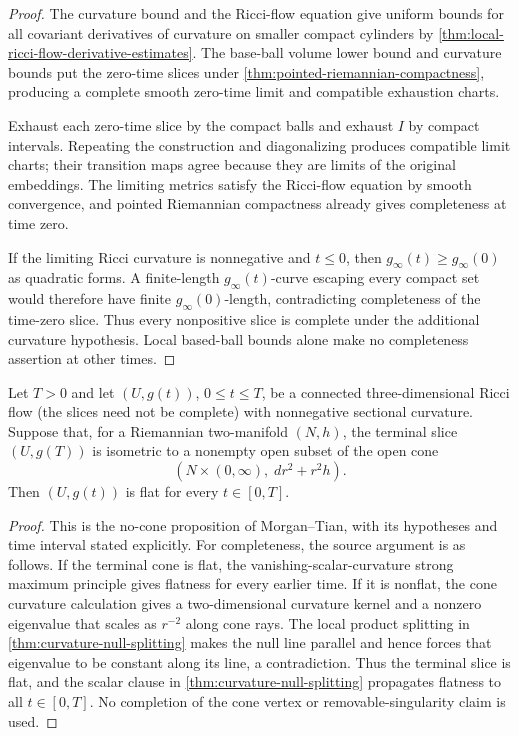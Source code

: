 \begin{proof}
The curvature bound and the Ricci-flow equation give uniform bounds for all
covariant derivatives of curvature on smaller compact cylinders by
\ref{thm:local-ricci-flow-derivative-estimates}.  The base-ball volume lower
bound and curvature bounds put the zero-time slices under
\ref{thm:pointed-riemannian-compactness}, producing a complete smooth
zero-time limit and compatible exhaustion charts.

Exhaust each zero-time slice by the compact balls and exhaust $I$ by compact
intervals.  Repeating the construction and diagonalizing produces compatible
limit charts; their transition maps agree because they are limits of the
original embeddings.  The limiting metrics satisfy the Ricci-flow equation
by smooth convergence, and pointed Riemannian compactness already gives
completeness at time zero.

If the limiting Ricci curvature is nonnegative and $t\le0$, then
$g_\infty(t)\ge g_\infty(0)$ as quadratic forms.  A finite-length
$g_\infty(t)$-curve escaping every compact set would therefore have finite
$g_\infty(0)$-length, contradicting completeness of the time-zero slice.
Thus every nonpositive slice is complete under the additional curvature
hypothesis.  Local based-ball bounds alone make no completeness assertion at
other times.
\end{proof}

\begin{lemma}
\label{lem:nonflat-terminal-cone-exclusion}
\notready
Let $T>0$ and let $(U,g(t))$, $0\le t\le T$, be a connected
three-dimensional Ricci flow (the slices need not be complete) with
nonnegative sectional curvature.  Suppose that, for a Riemannian
two-manifold $(N,h)$, the terminal slice $(U,g(T))$ is isometric to a
nonempty open subset of the open cone
\[
 (N\times(0,\infty),\;dr^2+r^2h).
\]
Then $(U,g(t))$ is flat for every $t\in[0,T]$.
\end{lemma}

\begin{proof}
This is the no-cone proposition of Morgan--Tian, with its hypotheses and
time interval stated explicitly.  For completeness, the source argument is
as follows.  If the terminal cone is flat, the vanishing-scalar-curvature
strong maximum principle gives flatness for every earlier time.  If it is
nonflat, the cone curvature calculation gives a two-dimensional curvature
kernel and a nonzero eigenvalue that scales as $r^{-2}$ along cone rays.
The local product splitting in
\ref{thm:curvature-null-splitting} makes the null line parallel and hence
forces that eigenvalue to be constant along its line, a contradiction.
Thus the terminal slice is flat, and the scalar clause in
\ref{thm:curvature-null-splitting} propagates flatness to all
$t\in[0,T]$.  No completion of the cone vertex or removable-singularity
claim is used.
\end{proof}

